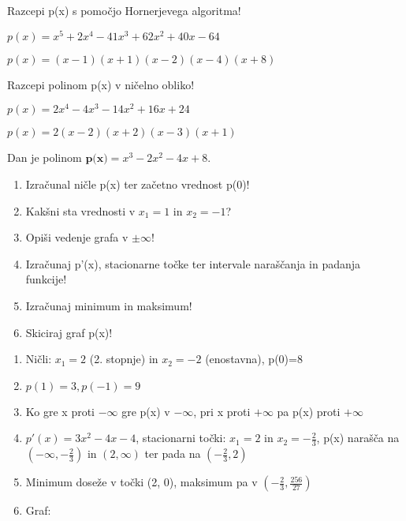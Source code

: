 \begin{vaja}
  Razcepi p(x) s pomočjo Hornerjevega algoritma!

$p(x)=x^5+2x^4-41x^3+62x^2+40x-64$

  \begin{odgovor}
    $p(x)=(x-1)(x+1)(x-2)(x-4)(x+8)$
  \end{odgovor}
\end{vaja}

\begin{vaja}
  Razcepi polinom p(x) v ničelno obliko!

$p(x)=2x^4-4x^3-14x^2+16x+24$


  \begin{odgovor}
    $p(x)=2(x-2)(x+2)(x-3)(x+1)$
  \end{odgovor}
\end{vaja}

\begin{vaja}
  Dan je polinom $\textbf{p(x)}= x^3-2x^2-4x+8$.
\begin{enumerate}
\item Izračunal ničle p(x) ter začetno vrednost p(0)!
\item Kakšni sta vrednosti v $x_1=1$ in $x_2=-1$?
\item Opiši vedenje grafa v $\pm \infty$!
\item Izračunaj p'(x), stacionarne točke ter intervale naraščanja in padanja funkcije!
\item Izračunaj minimum in maksimum!
\item Skiciraj graf p(x)!
\end{enumerate}

  \begin{odgovor}
    \begin{enumerate}
\item Ničli: $x_1=2$ (2. stopnje) in $x_2=-2$ (enostavna), p(0)=8
\item $p(1)=3, p(-1)=9$
\item Ko gre x proti $-\infty$ gre p(x) v $-\infty$, pri x proti $+\infty$ pa p(x) proti $+\infty$
\item $p'(x)=3x^2-4x-4$, stacionarni točki: $x_1=2$ in $x_2=-\frac{2}{3}$, p(x) narašča na $(-\infty, -\frac{2}{3})$  in $(2, \infty)$ ter pada na $(-\frac{2}{3}, 2)$
\item Minimum doseže v točki (2, 0), maksimum pa v $(-\frac{2}{3}, \frac{256}{27})$
\item Graf:
\end{enumerate}
  \end{odgovor}
\end{vaja}

